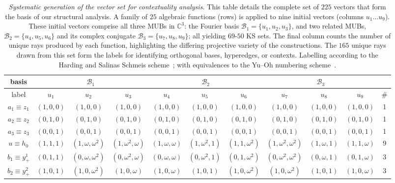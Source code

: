\documentclass[%
  reprint,
  superscriptaddress,
  showpacs,
  showkeys,
  amsmath,amssymb,
  pra,
  longbibliography,
  floatfix,
  x11names
]{revtex4-2}
\begin{document}
\begin{table}[htbp]
\caption{\label{tab:vector_generation}
\textit{Systematic generation of the vector set for contextuality analysis.}
This table details the complete set of $225$ vectors that form the basis of our structural analysis.
A family of $25$ algebraic functions (rows) is applied to nine initial vectors (columns $u_1\ldots u_9$).
These initial vectors comprise all three MUBs in $\mathbb{C}^3$:
the Fourier basis $\mathcal{B}_1 = \{u_1, u_2, u_3\}$,
and two related MUBs,
$\mathcal{B}_2 = \{u_4, u_5, u_6\}$ and its complex conjugate $\mathcal{B}_3 = \{u_7, u_8, u_9\}$; all yielding $69$-$50$ KS sets.
The final column counts the number of unique rays produced by each function,
highlighting the differing projective variety of the constructions.
The $165$ unique rays drawn from this set form the labels for identifying orthogonal bases, hyperedges, or contexts.
Labelling according to the Harding and Salinas Schmeis scheme~\cite{harding2025remarksIJTP};
with equivalences to the Yu--Oh numbering scheme~\cite{Yu-2012}.
}
\begin{ruledtabular}
\begin{tabular}{ccccccccccc}
basis&
      \multicolumn{3}{c|}{$\mathcal{B}_1$}&
      \multicolumn{3}{c|}{$\mathcal{B}_2$}&
      \multicolumn{3}{c}{$\mathcal{B}_3$}\\
\hline
label & $u_{1}$ & $u_{2}$ & $u_{3}$ & $u_{4}$ & $u_{5}$ & $u_{6}$ & $u_{7}$ & $u_{8}$ & $u_{9}$ & \#  \\ \hline
$a_1\equiv z_1$ & $(1,0,0)$ & $(1,0,0)$ & $(1,0,0)$ & $(1,0,0)$ & $(1,0,0)$ & $(1,0,0)$ & $(1,0,0)$ & $(1,0,0)$ & $(1,0,0)$ & 1 \\
$a_2\equiv z_2$ & $(0,1,0)$ & $(0,1,0)$ & $(0,1,0)$ & $(0,1,0)$ & $(0,1,0)$ & $(0,1,0)$ & $(0,1,0)$ & $(0,1,0)$ & $(0,1,0)$ & 1 \\
$a_3\equiv z_3$ & $(0,0,1)$ & $(0,0,1)$ & $(0,0,1)$ & $(0,0,1)$ & $(0,0,1)$ & $(0,0,1)$ & $(0,0,1)$ & $(0,0,1)$ & $(0,0,1)$ & 1 \\
$u\equiv h_0$ & $(1,1,1)$ & $(1,\omega,\omega^2)$ & $(1,\omega^2,\omega)$ & $(1,\omega,\omega)$ & $(1,\omega^2,1)$ & $(1,1,\omega^2)$ & $(1,\omega^2,\omega^2)$ & $(1,\omega,1)$ & $(1,1,\omega)$ & 9 \\
$b_1\equiv y_+^1$ & $(0,1,1)$ & $(0,\omega,\omega^2)$ & $(0,\omega^2,\omega)$ & $(0,\omega,\omega)$ & $(0,\omega^2,1)$ & $(0,1,\omega^2)$ & $(0,\omega^2,\omega^2)$ & $(0,\omega,1)$ & $(0,1,\omega)$ & 3 \\
$b_2\equiv y_+^2$ & $(1,0,1)$ & $(1,0,\omega^2)$ & $(1,0,\omega)$ & $(1,0,\omega)$ & $(1,0,1)$ & $(1,0,\omega^2)$ & $(1,0,\omega^2)$ & $(1,0,1)$ & $(1,0,\omega)$ & 3 \\

\end{tabular}
\end{ruledtabular}
\end{table}
\end{document}

